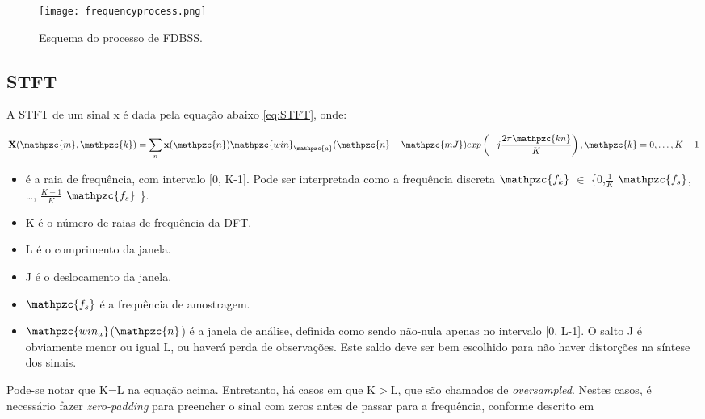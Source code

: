         \begin{figure}[h!]
            \texttt{[image: frequencyprocess.png]}
            \caption{Esquema do processo de FDBSS.}
            \label{fig:frequencymodel}
        \end{figure}

    \subsection{STFT} \label{sec:stft}
        A STFT de um sinal x é dada pela equação abaixo \ref{eq:STFT}, onde:

    \begin{equation}\label{eq:STFT}
        \mathbf{X}(\mathpzc{m},\mathpzc{k})
        = \sum_{n} \mathbf{x}(\mathpzc{n})
        \mathpzc{win}_\mathpzc{a}(\mathpzc{n} - \mathpzc{mJ})
        exp \left( -j \frac{2\pi\mathpzc{kn}}{K} \right), \mathpzc{k} = 0, \dots, K-1
    \end{equation}


        \begin{itemize}
            
            \item {} é a raia de frequência, com intervalo [0, K-1]. Pode ser interpretada como a frequência discreta $\mathpzc{f_k}$ $\in$ \big\{0,$\frac{1}{K}$ $\mathpzc{f_s}$, \dots, $\frac{K-1}{K}$ $\mathpzc{f_s}$ \big\}.
                        
            \item K é o número de raias de frequência da DFT.
                        
            \item L é o comprimento da janela.
                        
            \item J é o deslocamento da janela.
            
            \item  $\mathpzc{f_s}$ é a frequência de amostragem.
            
            \item $\mathpzc{win_a}$($\mathpzc{n}$) é a janela de análise, definida como sendo não-nula apenas no intervalo [0, L-1]. O salto J é obviamente menor ou igual L, ou haverá perda de observações. Este saldo deve ser bem escolhido para não haver distorções na síntese dos sinais.
        \end{itemize}
    
        Pode-se notar que K=L na equação acima. Entretanto, há casos em que K$>$L, que são chamados de \textit{oversampled}. Nestes casos, é necessário fazer \textit{zero-padding} para preencher o sinal com zeros antes de passar para a frequência, conforme descrito em \cite{STFT}
        
